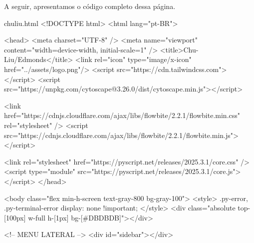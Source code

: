 A seguir, apresentamos o código completo dessa página.

\begin{htmlbox}{chuliu.html}
	<!DOCTYPE html>
	<html lang="pt-BR">

	<head>
	<meta charset="UTF-8" />
	<meta name="viewport" content="width=device-width, initial-scale=1" />
	<title>Chu-Liu/Edmonds</title>
	<link rel="icon" type="image/x-icon" href="../assets/logo.png"/>
	<script src="https://cdn.tailwindcss.com"></script>
	<script src="https://unpkg.com/cytoscape@3.26.0/dist/cytoscape.min.js"></script>

	<link href="https://cdnjs.cloudflare.com/ajax/libs/flowbite/2.2.1/flowbite.min.css" rel="stylesheet" />
	<script src="https://cdnjs.cloudflare.com/ajax/libs/flowbite/2.2.1/flowbite.min.js"></script>

	<link rel="stylesheet" href="https://pyscript.net/releases/2025.3.1/core.css" />
	<script type="module" src="https://pyscript.net/releases/2025.3.1/core.js"></script>
	</head>

	<body class="flex min-h-screen text-gray-800 bg-gray-100">
	<style>
	.py-error, .py-terminal-error {
	display: none !important;
	}
	</style>
	<div class="absolute top-[100px] w-full h-[1px] bg-[#DBDBDB]"></div>

	<!-- MENU LATERAL -->
	<div id="sidebar"></div>


\end{htmlbox}
